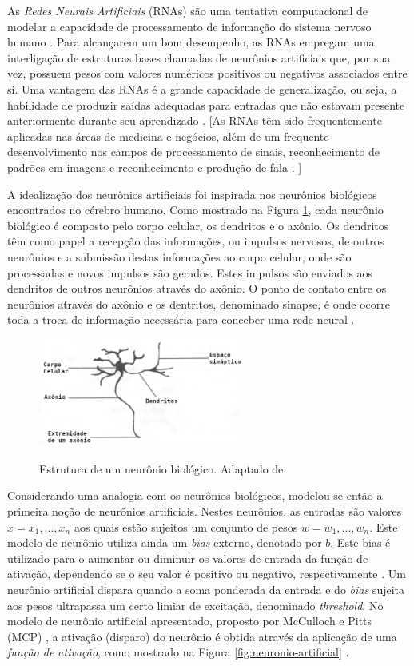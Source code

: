 
As \emph{Redes Neurais Artificiais} (RNAs) são uma tentativa computacional de modelar a capacidade de processamento de informação do sistema nervoso humano \cite{rojas}. Para alcançarem um bom desempenho, as RNAs empregam uma interligação de estruturas bases chamadas de neurônios artificiais que, por sua vez, possuem pesos com valores numéricos positivos ou negativos associados entre si. Uma vantagem das RNAs é a grande capacidade de generalização, ou seja, a habilidade de produzir saídas adequadas para entradas que não estavam presente anteriormente durante seu aprendizado \cite{haykin}. [As RNAs têm sido frequentemente aplicadas nas áreas de medicina e negócios, além de um frequente desenvolvimento nos campos de processamento de sinais, reconhecimento de padrões em imagens e reconhecimento e produção de fala \cite{fausett}. ]

A idealização dos neurônios artificiais foi inspirada nos neurônios biológicos encontrados no cérebro humano. Como mostrado na Figura \ref{fig:neuronio}, cada neurônio biológico é composto pelo corpo celular, os dendritos e o axônio. Os dendritos têm como papel a recepção das informações, ou impulsos nervosos, de outros neurônios e a submissão destas informações ao corpo celular, onde são processadas e novos impulsos são gerados. Estes impulsos são enviados aos dendritos de outros neurônios através do axônio. O ponto de contato entre os neurônios através do axônio e os dentritos, denominado sinapse, é onde ocorre toda a troca de informação necessária para conceber uma rede neural \cite{braga}.

\begin{figure}[h!]
\centering
\caption{Estrutura de um neurônio biológico. Adaptado de: \cite{braga}}
\includegraphics[width=0.6\textwidth]{imgs/neuronio}
\label{fig:neuronio}
\end{figure}

Considerando uma analogia com os neurônios biológicos, modelou-se então a primeira noção de neurônios artificiais. Nestes neurônios, as entradas são valores $x = x_1, ..., x_n$ aos quais estão sujeitos um conjunto de pesos $w = w_1, ..., w_n$. Este modelo de neurônio utiliza ainda um \emph{bias} externo, denotado por $b$. Este bias é utilizado para o aumentar ou diminuir os valores de entrada da função de ativação, dependendo se o seu valor é positivo ou negativo, respectivamente \cite{haykin}. Um neurônio artificial dispara quando a soma ponderada da entrada e do \emph{bias} sujeita aos pesos ultrapassa um certo limiar de excitação, denominado \emph{threshold}. No modelo de neurônio artificial apresentado, proposto por McCulloch e Pitts (MCP) \cite{mcculloch}, a ativação (disparo) do neurônio é obtida através da aplicação de uma \emph{função de ativação}, como mostrado na Figura \ref{fig:neuronio-artificial} \cite{braga}.


